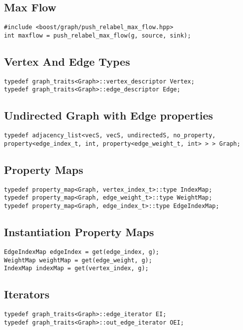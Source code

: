 \documentclass[11pt]{article}
\begin{document}
\subsection{Max Flow}
\begin{lstlisting}
#include <boost/graph/push_relabel_max_flow.hpp>
int maxflow = push_relabel_max_flow(g, source, sink);
\end{lstlisting}

\subsection{Vertex And Edge Types}
\begin{lstlisting}
typedef graph_traits<Graph>::vertex_descriptor Vertex;
typedef graph_traits<Graph>::edge_descriptor Edge;
\end{lstlisting}

\subsection{Undirected Graph with Edge properties}
\begin{lstlisting}
typedef adjacency_list<vecS, vecS, undirectedS, no_property, property<edge_index_t, int, property<edge_weight_t, int> > > Graph;
\end{lstlisting}

\subsection{Property Maps}
\begin{lstlisting}
typedef property_map<Graph, vertex_index_t>::type IndexMap;
typedef property_map<Graph, edge_weight_t>::type WeightMap;
typedef property_map<Graph, edge_index_t>::type EdgeIndexMap;
\end{lstlisting}

\subsection{Instantiation Property Maps}
\begin{lstlisting}
EdgeIndexMap edgeIndex = get(edge_index, g);
WeightMap weightMap = get(edge_weight, g);
IndexMap indexMap = get(vertex_index, g);
\end{lstlisting}

\subsection{Iterators}
\begin{lstlisting}
typedef graph_traits<Graph>::edge_iterator EI;
typedef graph_traits<Graph>::out_edge_iterator OEI;
\end{lstlisting}
\end{document}
